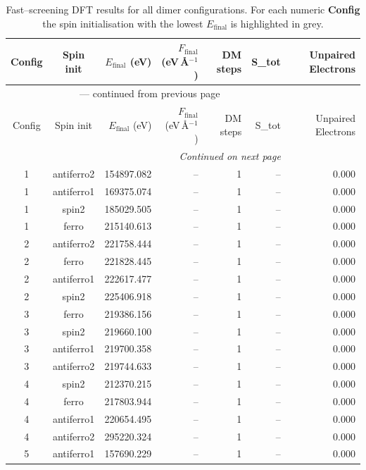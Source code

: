 
\begin{longtable}{@{}ccrrrrr@{}}
\caption{Fast–screening DFT results for all dimer configurations.
         For each numeric \textbf{Config} the spin initialisation with the
         lowest $E_{\mathrm{final}}$ is highlighted in grey.}\label{tab:dimer_full}\\
\toprule
Config & Spin init & $E_{\mathrm{final}}$ (eV) &
$F_{\mathrm{final}}$ (eV\,\AA$^{-1}$) & DM steps & S_{tot} & Unpaired Electrons\\
\midrule
\endfirsthead
\multicolumn{6}{c}{{\tablename}~\thetable{} — continued from previous page}\\
\toprule
Config & Spin init & $E_{\mathrm{final}}$ (eV) &
$F_{\mathrm{final}}$ (eV\,\AA$^{-1}$) & DM steps & S_{tot} & Unpaired Electrons\\
\midrule
\endhead
\midrule
\multicolumn{6}{r}{\emph{Continued on next page}}\\
\endfoot
\bottomrule
\endlastfoot
\rowcolor{gray!20} 1 & antiferro2 & 154897.082 & -- & 1 & -- & 0.000 \\
1 & antiferro1 & 169375.074 & -- & 1 & -- & 0.000 \\
1 & spin2 & 185029.505 & -- & 1 & -- & 0.000 \\
1 & ferro & 215140.613 & -- & 1 & -- & 0.000 \\
\rowcolor{gray!20} 2 & antiferro2 & 221758.444 & -- & 1 & -- & 0.000 \\
2 & ferro & 221828.445 & -- & 1 & -- & 0.000 \\
2 & antiferro1 & 222617.477 & -- & 1 & -- & 0.000 \\
2 & spin2 & 225406.918 & -- & 1 & -- & 0.000 \\
\rowcolor{gray!20} 3 & ferro & 219386.156 & -- & 1 & -- & 0.000 \\
3 & spin2 & 219660.100 & -- & 1 & -- & 0.000 \\
3 & antiferro1 & 219700.358 & -- & 1 & -- & 0.000 \\
3 & antiferro2 & 219744.633 & -- & 1 & -- & 0.000 \\
\rowcolor{gray!20} 4 & spin2 & 212370.215 & -- & 1 & -- & 0.000 \\
4 & ferro & 217803.944 & -- & 1 & -- & 0.000 \\
4 & antiferro1 & 220654.495 & -- & 1 & -- & 0.000 \\
4 & antiferro2 & 295220.324 & -- & 1 & -- & 0.000 \\
\rowcolor{gray!20} 5 & antiferro1 & 157690.229 & -- & 1 & -- & 0.000 \\

\end{longtable}
